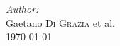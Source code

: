 \begin{titlepage}
\Large \emph{Author:}\\
Gaetano \textsc{Di Grazia} et al.\\[3cm] %


{\large \today}\\[2cm] %


 

\vfill %

\end{titlepage}



